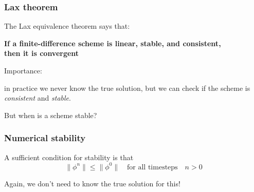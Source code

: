 \documentclass[aspectratio=43,9pt]{beamer}
\begin{document}
%
%
\begin{frame}
	\frametitle{Lax theorem}
	The Lax equivalence theorem says that:\\
	\begin{center}
		\bfseries
		If a finite-difference scheme is {linear}, {stable}, and {consistent},\\
		then it is {convergent}
	\end{center}
\pause
	\par\vspace*{4ex}
	Importance: \parbox[t]{.6\textwidth}{in practice we never know the true solution, but we can check if the scheme is \emph{consistent} and \emph{stable}.}
	\par\vspace*{3ex}
	But when is a scheme stable?
\end{frame}
%
%
\begin{frame}
	\frametitle{Numerical stability}
	A sufficient condition for stability is that\vspace*{2ex}
	\begin{equation*}
		\| \phi^n \| \le \| \phi^0 \| \quad \text{for all timesteps} \quad n>0
	\end{equation*}\par\vspace*{5ex}
	Again, we don't need to know the true solution for this!
\end{frame}
%
%
\end{document}

